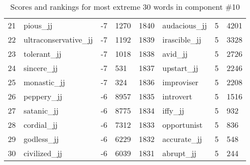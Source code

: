 \begin{table}[tbp]
\begin{tabular}{| rlr@{.}l | rlr@{.}l |}
    21 & pious\_jj & -7 & 1270    &    1840 & audacious\_jj & 5 & 4201 \\
    22 & ultraconservative\_jj & -7 & 1192    &    1839 & irascible\_jj & 5 & 3328 \\
    23 & tolerant\_jj & -7 & 1018    &    1838 & avid\_jj & 5 & 2726 \\
    24 & sincere\_jj & -7 & 531    &    1837 & upstart\_jj & 5 & 2246 \\
    25 & monastic\_jj & -7 & 324    &    1836 & improviser & 5 & 2208 \\
    26 & peppery\_jj & -6 & 8957    &    1835 & introvert & 5 & 1516 \\
    27 & satanic\_jj & -6 & 8775    &    1834 & iffy\_jj & 5 & 932 \\
    28 & cordial\_jj & -6 & 7312    &    1833 & opportunist & 5 & 836 \\
    29 & godless\_jj & -6 & 6229    &    1832 & accurate\_jj & 5 & 548 \\
    30 & civilized\_jj & -6 & 6039    &    1831 & abrupt\_jj & 5 & 244 \\
    \hline
    \end{tabular}
    \caption{Scores and rankings for most extreme 30 words in component \#10} 
\end{table}
\clearpage
